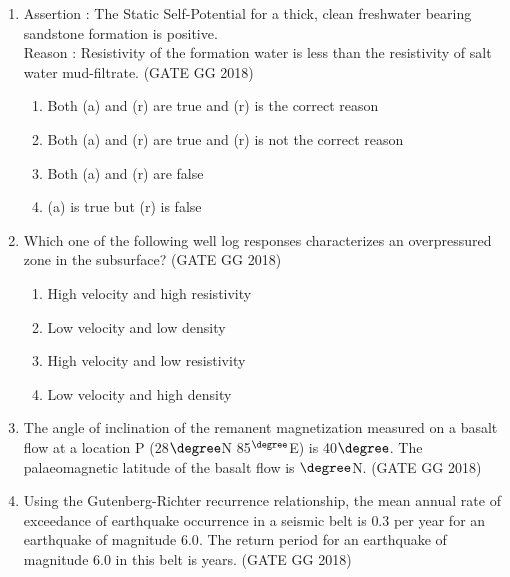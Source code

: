 \documentclass[journal]{IEEEtran}
\begin{document}
\begin{enumerate}[start=1]
\item Assertion : The Static Self-Potential for a thick, clean freshwater bearing sandstone formation is positive.\\
Reason : Resistivity of the formation water is less than the resistivity of salt water mud-filtrate.
\hfill(GATE GG 2018)
\begin{enumerate}
\item Both (a) and (r) are true and (r) is the correct reason
\item Both (a) and (r) are true and (r) is not the correct reason
\item Both (a) and (r) are false
\item (a) is true but (r) is false
\end{enumerate}

\item Which one of the following well log responses characterizes an overpressured zone in the subsurface?
\hfill(GATE GG 2018)
\begin{enumerate}
\item High velocity and high resistivity
\item Low velocity and low density
\item High velocity and low resistivity
\item Low velocity and high density
\end{enumerate}

\item The angle of inclination of the remanent magnetization measured on a basalt flow at a location P (28$\degree$N 85$^\degree$E) is 40$\degree$.  
The palaeomagnetic latitude of the basalt flow is \makebox[2cm]{\hrulefill} $\degree$N.
\hfill(GATE GG 2018)
\vspace{0.5cm}

\item Using the Gutenberg-Richter recurrence relationship, the mean annual rate of exceedance of earthquake occurrence in a seismic belt is $0.3$ per year for an earthquake of magnitude $6.0$.  The return period for an earthquake of magnitude $6.0$ in this belt is \makebox[2cm]{\hrulefill} years.
\hfill(GATE GG 2018)
\vspace{0.5cm}


\end{enumerate}
\end{document}
